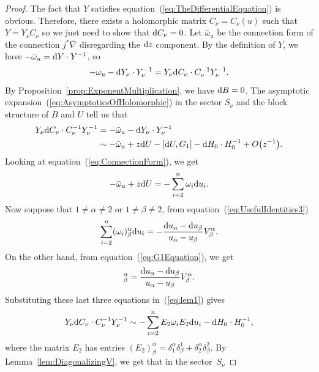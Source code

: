 \documentclass[10pt,a4paper]{amsart}
\numberwithin{equation}{section}
\begin{document}
\begin{proof}
 The fact that $Y$ satisfies equation~(\ref{eq:TheDifferentialEquation}) is obvious. Therefore, there exists a holomorphic matrix $C_{\nu}=C_{\nu}(u)$ such that $Y=Y_{\nu}C_{\nu}$ so we just need to show that ${\rm d}C_{\nu}=0$. Let $\bar{\omega}_{u}$ be the connection form of the connection $j^{*}\bar{\nabla}$ disregarding the ${\rm d}z$ component. By the definition of $Y$, we have $-\bar{\omega}_{u}={\rm d}Y\cdot Y^{-1}$, so
 \begin{equation*}
 -\omega_{u}-{\rm d}Y_{\nu}\cdot Y_{\nu}^{-1}=Y_{\nu}{\rm d}C_{\nu}\cdot C_{\nu}^{-1}Y_{\nu}^{-1}.
 \end{equation*}
 By Proposition~\ref{prop:ExponentMultiplication}, we have ${\rm d}B=0$. The asymptotic expansion~(\ref{eq:AsymptoticsOfHolomorphic}) in the sector $S_{\nu}$ and the block structure of $B$ and $U$ tell us that
 \begin{align}
 Y_{\nu}{\rm d} C_{\nu}\cdot C_{\nu}^{-1}Y_{\nu}^{-1}& =-\bar{\omega}_{u}-{\rm d}Y_{\nu}\cdot Y_{\nu}^{-1}\nonumber\\
 & \sim-\bar{\omega}_{u} +z{\rm d}U-[{\rm d}U,G_{1}]-{\rm d}H_{0}\cdot H_{0}^{-1}+O\bigl(z^{-1}\bigr).
 \label{eq:lem1}
 \end{align}
Looking at equation~(\ref{eq:ConnectionForm}), we get
\begin{equation*}
 -\bar{\omega}_{u}+z{\rm d}U=-\sum_{i=2}^{n}\omega_{i}{\rm d}u_{i}.
\end{equation*}
Now suppose that $1\neq\alpha\neq 2$ or $1\neq\beta\neq 2$, from equation~(\ref{eq:UsefulIdentities3})
\begin{equation*}
 \sum_{i=2}^{n}(\omega_{i})^{\alpha}_{\beta}{\rm d}u_{i}=-\frac{{\rm d}u_{\alpha}-{\rm d}u_{\beta}}{u_{\alpha}-u_{\beta}}V^{\alpha}_{\beta}.
\end{equation*}
On the other hand, from equation~(\ref{eq:G1Equation}), we get
\begin{equation*}
 [{\rm d}U,G_{1}]^{\alpha}_{\beta}=\frac{{\rm d}u_{\alpha}-{\rm d}u_{\beta}}{u_{\alpha}-u_{\beta}}V^{\alpha}_{\beta}.
\end{equation*}
Substituting these last three equations in~(\ref{eq:lem1}) gives
\begin{equation*}
 Y_{\nu}{\rm d}C_{\nu}\cdot C_{\nu}^{-1}Y_{\nu}^{-1}\sim-\sum_{i=2}^{n}E_{2}\omega_{i}E_{2}{\rm d}u_{i}-{\rm d}H_{0}\cdot H_{0}^{-1},
\end{equation*}
where the matrix $E_{2}$ has entries $(E_{2})^{\alpha}_{\beta}=\delta^{\alpha}_{1}\delta^{1}_{\beta}+\delta^{\alpha}_{2}\delta^{2}_{\beta}$. By Lemma~\ref{lem:DiagonalizingV}, we get that in the sector~$S_{\nu}$

\end{proof}
\end{document}
